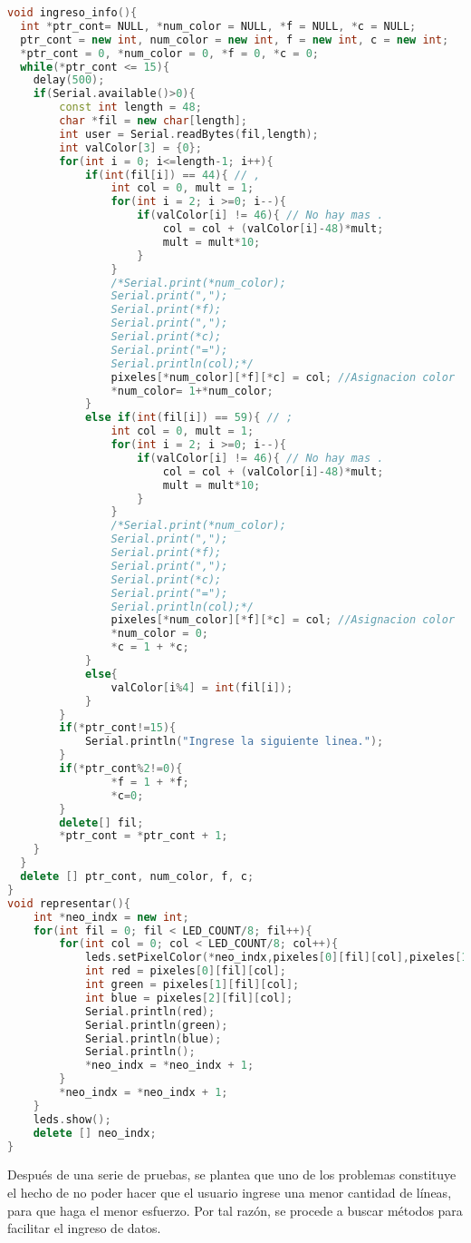 \documentclass{article}
\begin{document}
\begin{lstlisting}[language=C++, label=error_electronica]
void ingreso_info(){
  int *ptr_cont= NULL, *num_color = NULL, *f = NULL, *c = NULL;
  ptr_cont = new int, num_color = new int, f = new int, c = new int;
  *ptr_cont = 0, *num_color = 0, *f = 0, *c = 0;
  while(*ptr_cont <= 15){
  	delay(500);
    if(Serial.available()>0){
    	const int length = 48;
    	char *fil = new char[length];
      	int user = Serial.readBytes(fil,length);
      	int valColor[3] = {0};
      	for(int i = 0; i<=length-1; i++){
        	if(int(fil[i]) == 44){ // ,
          		int col = 0, mult = 1;
          		for(int i = 2; i >=0; i--){
            		if(valColor[i] != 46){ // No hay mas .
              			col = col + (valColor[i]-48)*mult;
              			mult = mult*10;
            		}
                }
              	/*Serial.print(*num_color);
                Serial.print(",");
                Serial.print(*f);
                Serial.print(",");
                Serial.print(*c);
                Serial.print("=");
                Serial.println(col);*/
              	pixeles[*num_color][*f][*c] = col; //Asignacion color
              	*num_color= 1+*num_color;
    	    }
        	else if(int(fil[i]) == 59){ // ;
              	int col = 0, mult = 1;
          		for(int i = 2; i >=0; i--){
            		if(valColor[i] != 46){ // No hay mas .
              			col = col + (valColor[i]-48)*mult;
              			mult = mult*10;
            		}
                }
                /*Serial.print(*num_color);
                Serial.print(",");
                Serial.print(*f);
                Serial.print(",");
                Serial.print(*c);
                Serial.print("=");
                Serial.println(col);*/
            	pixeles[*num_color][*f][*c] = col; //Asignacion color
          		*num_color = 0;
          		*c = 1 + *c;
        	}
            else{
            	valColor[i%4] = int(fil[i]);
            }
      	}
      	if(*ptr_cont!=15){
        	Serial.println("Ingrese la siguiente linea.");
      	}
      	if(*ptr_cont%2!=0){
          		*f = 1 + *f;
          		*c=0;
       	}
      	delete[] fil;
	    *ptr_cont = *ptr_cont + 1;
    }
  }
  delete [] ptr_cont, num_color, f, c;
}
void representar(){
  	int *neo_indx = new int;
    for(int fil = 0; fil < LED_COUNT/8; fil++){
       	for(int col = 0; col < LED_COUNT/8; col++){
            leds.setPixelColor(*neo_indx,pixeles[0][fil][col],pixeles[1][fil][col],pixeles[2][fil][col]);
          	int red = pixeles[0][fil][col];
          	int green = pixeles[1][fil][col];
          	int blue = pixeles[2][fil][col];
          	Serial.println(red);
        	Serial.println(green);
         	Serial.println(blue);
          	Serial.println();
        	*neo_indx = *neo_indx + 1;
        }
      	*neo_indx = *neo_indx + 1;
    }
  	leds.show();
  	delete [] neo_indx;
}
\end{lstlisting}
Después de una serie de pruebas, se plantea que uno de los problemas constituye el hecho de no poder hacer que el usuario ingrese una menor cantidad de líneas, para que haga el menor esfuerzo. Por tal razón, se procede a buscar métodos para facilitar el ingreso de datos.


\end{document}

